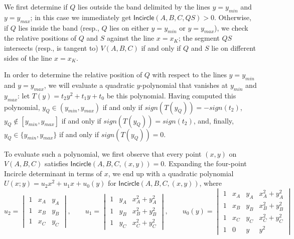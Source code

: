 \documentclass[letterpaper,11pt]{article}
\newcommand{\incircle}{\textsf{Incircle}\xspace}
\begin{document}
We first determine if $Q$ lies outside the band delimited by the lines
$y=y_{min}$ and $y=y_{max}$; in this case we immediately get
$\incircle(A,B,C,QS) >0$. Otherwise, if $Q$ lies inside the band
(resp., $Q$ lies on either $y=y_{min}$ or $y=y_{max}$), we check the
relative positions of $Q$ and $S$ against the line $x=x_K$; the
segment $QS$ intersects (resp., is tangent to) $V(A,B,C)$ if and only
if $Q$ and $S$ lie on different sides of the line $x=x_K$. 

In order to determine the relative position of $Q$ with respect to the lines 
$y=y_{min}$ and $y=y_{max}$, we will evaluate a quadratic $y$-polynomial 
that vanishes at $y_{min}$ and $y_{max}$: let $T(y)=t_2y^2+t_1y+t_0$
be this polynomial.
Having computed this polynomial, $y_Q\in(y_{min},y_{max})$ if and only
if $sign(T(y_Q)) =-sign(t_2) $,
$y_Q\not\in[y_{min},y_{max}]$ if and only if $sign(T(y_Q))=sign(t_2)$,
and, finally, $y_Q\in\{y_{min},y_{max}\}$ if and only if $sign(T(y_Q))=0$.

To evaluate such a polynomial, we first observe that every point $(x,y)$
on $V(A,B,C)$ satisfies $ \incircle(A,B,C,(x,y))=0$. Expanding the four-point \incircle determinant in terms of $x$, we end
up with a quadratic polynomial $U(x;y) = u_2x^2+u_1x+u_0(y)$ for
$\incircle(A,B,C,(x,y))$, where
\begin{equation*}
u_2 = \begin{vmatrix}
1 & x_A & y_A\\
1 & x_B & y_B\\
1 & x_C & y_C
\end{vmatrix}, \qquad
u_1 = \begin{vmatrix}
1 & y_A & x_A^2 +y_A^2\\
1 & y_B & x_B^2 +y_B^2\\
1 & y_C & x_C^2 +y_C^2
\end{vmatrix}, \qquad
u_0(y) = \begin{vmatrix}
1 & x_A & y_A & x_A^2 + y_A^2 \\
1 & x_B & y_B & x_B^2 + y_B^2 \\
1 & x_C & y_C & x_C^2 + y_C^2 \\
1 & 0 & y &   y^2
\end{vmatrix}
\end{equation*}
\end{document}
